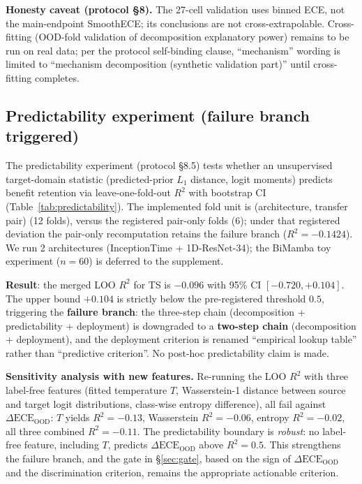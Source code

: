 \documentclass[review,12pt,nonatbib]{elsarticle}
\begin{document}
\textbf{Honesty caveat (protocol \S8).} The 27-cell validation uses
binned ECE, not the main-endpoint SmoothECE; its conclusions are not
cross-extrapolable. Cross-fitting (OOD-fold validation of
decomposition explanatory power) remains to be run on real data; per
the protocol self-binding clause, ``mechanism'' wording is limited to
``mechanism decomposition (synthetic validation part)'' until
cross-fitting completes.

\subsection{Predictability experiment (failure branch triggered)}
\label{sec:predictability}
The predictability experiment (protocol \S8.5) tests whether an
unsupervised target-domain statistic (predicted-prior $L_1$ distance,
logit moments) predicts benefit retention via leave-one-fold-out
$R^2$ with bootstrap CI (Table~\ref{tab:predictability}). The
implemented fold unit is (architecture, transfer pair) (12 folds),
versus the registered pair-only folds (6); under that registered
deviation the pair-only recomputation retains the failure branch
($R^2=-0.1424$). We run 2 architectures (InceptionTime + 1D-ResNet-34);
the BiMamba toy experiment ($n=60$) is deferred to the supplement.

\textbf{Result}: the merged LOO $R^2$ for TS is $-0.096$ with 95\% CI
$[-0.720, +0.104]$. The upper bound $+0.104$ is strictly below the
pre-registered threshold $0.5$, triggering the \textbf{failure
branch}: the three-step chain (decomposition + predictability +
deployment) is downgraded to a \textbf{two-step chain} (decomposition
+ deployment), and the deployment criterion is renamed ``empirical
lookup table'' rather than ``predictive criterion''. No post-hoc
predictability claim is made.

\textbf{Sensitivity analysis with new features.} Re-running the LOO
$R^2$ with three label-free features (fitted temperature $T$,
Wasserstein-1 distance between source and target logit distributions,
class-wise entropy difference), all fail against
$\Delta\text{ECE}_{\text{OOD}}$: $T$ yields $R^2=-0.13$,
Wasserstein $R^2=-0.06$, entropy $R^2=-0.02$, all three combined
$R^2=-0.11$. The predictability boundary is \emph{robust}: no
label-free feature, including $T$, predicts
$\Delta\text{ECE}_{\text{OOD}}$ above $R^2=0.5$. This strengthens the
failure branch, and the gate in \S\ref{sec:gate}, based on the sign
of $\Delta\text{ECE}_{\text{OOD}}$ and the discrimination criterion,
remains the appropriate actionable criterion.
\end{document}
